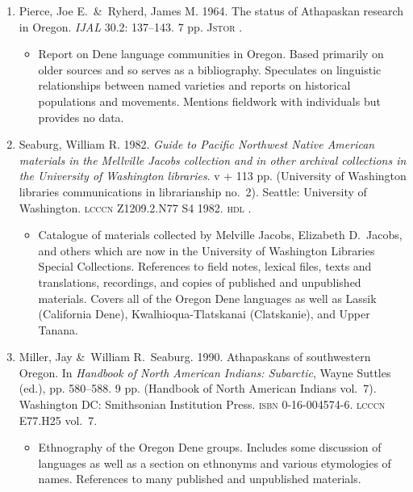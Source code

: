\documentclass[12pt,letterpaper,oneside,article]{memoir}
\begin{document}
\begin{enumerate}
\item	Pierce, Joe E.\ \&\ Ryherd, James M.
	1964.
	The status of Athapaskan research in Oregon.
	\textit{IJAL} 30.2: 137–143.
	7 pp.
	\textsc{Jstor} .
	\begin{itemize}
	\item	Report on Dene language communities in Oregon.
		Based primarily on older sources and so serves as a bibliography.
		Speculates on linguistic relationships between named varieties and reports on
		historical populations and movements.
		Mentions fieldwork with individuals but provides no data.
	\end{itemize}
\item	Seaburg, William R.
	1982.
	\textit{Guide to Pacific Northwest Native American materials in the Mellville Jacobs
		collection and in other archival collections in the University of Washington
		libraries}.
	v + 113 pp.
	(University of Washington libraries communications in librarianship no.\ 2).
	Seattle: University of Washington.
	\textsc{lcccn} Z1209.2.N77 S4 1982.
	\textsc{hdl} .
	\begin{itemize}
	\item	Catalogue of materials collected by Melville Jacobs, Elizabeth D.\ Jacobs,
		and others which are now in the University of Washington Libraries Special
		Collections.
		References to field notes, lexical files, texts and translations,
		recordings, and copies of published and unpublished materials.
		Covers all of the Oregon Dene languages as well as Lassik (California Dene),
		Kwalhioqua-Tlatskanai (Clatskanie), and Upper Tanana.
	\end{itemize}
\item	Miller, Jay \&\ William R.\ Seaburg.
	1990.
	Athapaskans of southwestern Oregon.
	In \textit{Handbook of North American Indians: Subarctic},
	Wayne Suttles (ed.), pp. 580–588.
	9 pp.
	(Handbook of North American Indians vol.\ 7).
	Washington DC: Smithsonian Institution Press.
	\textsc{isbn} 0-16-004574-6.
	\textsc{lcccn} E77.H25 vol.\ 7.
	\begin{itemize}
	\item	Ethnography of the Oregon Dene groups.
		Includes some discussion of languages as well as a section on ethnonyms and
		various etymologies of names.
		References to many published and unpublished materials.
	\end{itemize}
\end{enumerate}
\end{document}
